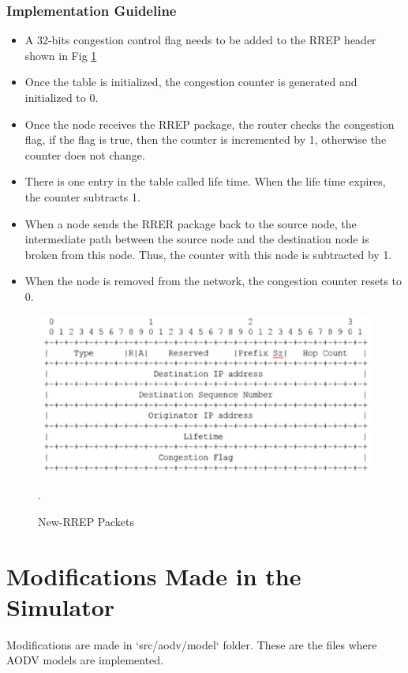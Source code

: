 \documentclass[12pt, a4paper]{article}
\begin{document}
\subsubsection{Implementation Guideline}
\begin{itemize}
    \item A 32-bits congestion control flag needs to be added to the RREP header shown in Fig \ref{fig:rrep-header}
    \item Once the table is initialized, the congestion counter is
generated and initialized to 0.
    \item Once the node receives the RREP package, the router
checks the congestion flag, if the flag is true, then the counter
is incremented by 1, otherwise the counter does not change.
    \item There is one entry in the table called life time. When the life time expires, the counter subtracts 1.
    \item When a node sends the RRER package back to the source node, the intermediate path between the source node and the destination node is broken from this node. Thus, the counter with this node is subtracted by 1.
    \item When the node is removed from the network, the congestion
counter resets to 0.
\end{itemize}
\begin{figure}[H]
\centering
\includegraphics[scale = 0.6]{images/cc-aodv/rrep-header.png}
\caption{New-RREP Packets}.
\label{fig:rrep-header}
\end{figure}

\section{Modifications Made in the Simulator}
Modifications are made in `src/aodv/model` folder. These are the files where AODV models are implemented.
\end{document}
